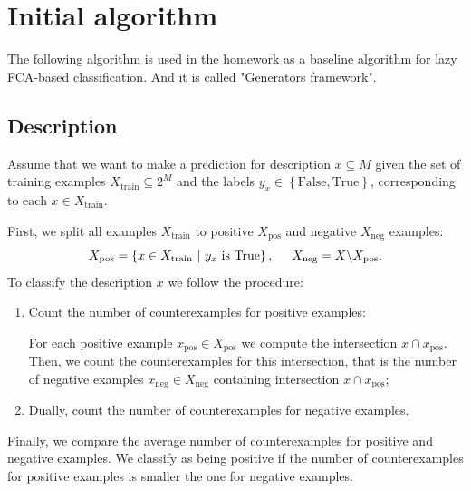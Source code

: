 \documentclass[12pt]{report}
\begin{document}
\section{Initial algorithm}
The following algorithm is used in the homework as a baseline algorithm for lazy FCA-based classification. And it is called "Generators framework".
\subsection*{Description}
Assume that we want to make a prediction for description $x \subseteq M$ given the set of training examples \mbox{$X_{\text{train}} \subseteq 2^M$} and the labels $y_x \in \left\{\text{False}, \text{True}\right\}$, corresponding to each $x \in X_{\text{train}}$.

\par 
First, we split all examples $X_{\text{train}}$ to positive $X_{\text{pos}}$ and negative $X_{\text{neg}}$ examples:
\[
  X_{\text{pos}} = \left\{ x \in X_{\text{train}}\ | \ y_x \text{ is True}\right\}, \hspace*{0.5cm} X_{\text{neg}} = X \backslash X_{\text{pos}}.
\]
To classify the description $x$ we follow the procedure:
\begin{enumerate}
  \item Count the number of counterexamples for positive examples:
  \par For each positive example $x_{\text{pos}} \in X_{\text{pos}}$ we compute  the intersection $x \cap x_{\text{pos}}$. Then, we count the counterexamples for this intersection, that is the number of negative examples $x_{\text{neg}} \in X_{\text{neg}}$ containing intersection  $x\cap x_{\text{pos}}$;
  \item Dually, count the number of counterexamples for negative examples. 
\end{enumerate}
Finally, we compare the average number of counterexamples for positive and negative examples. We classify  as being positive if the number of counterexamples for positive examples is smaller the one for negative examples.
\end{document}
